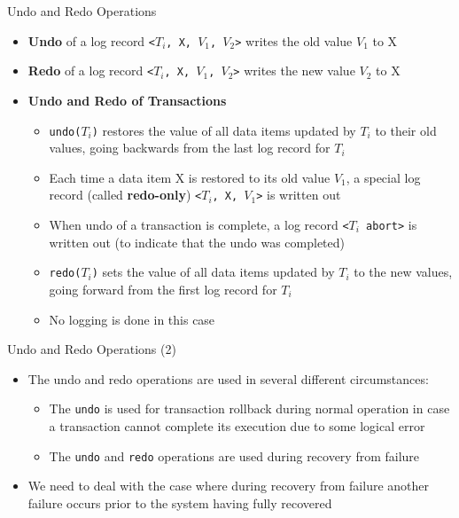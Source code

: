 \documentclass[aspectratio=169, xcolor=dvipsnames]{beamer}
\begin{document}
\begin{frame}{Undo and Redo Operations}
    \begin{itemize}[<+->]
        \item \textbf{Undo} of a log record \texttt{<$T_i$, X, $V_1$, $V_2$>} writes the old value $V_1$ to X
        \item \textbf{Redo} of a log record \texttt{<$T_i$, X, $V_1$, $V_2$>} writes the new value $V_2$ to X
        \item \textbf{Undo and Redo of Transactions}
        \begin{itemize}
            \item[$\triangleright$] \texttt{undo($T_i$)} restores the value of all data items updated by $T_i$ to their old values, going backwards from the last log record for $T_i$
            \item[$\triangleright$] Each time a data item X is restored to its old value $V_1$, a special log record (called \textbf{redo-only}) \texttt{<$T_i$, X, $V_1$>} is written out
            \item[$\triangleright$] When undo of a transaction is complete, a log record \texttt{<$T_i$ abort>} is written out (to indicate that the undo was completed)
            \item[$\triangleright$] \texttt{redo($T_i$)} sets the value of all data items updated by $T_i$ to the new values, going forward from the first log record for $T_i$
            \item[$\triangleright$] No logging is done in this case
        \end{itemize}
    \end{itemize}
\end{frame}

\begin{frame}{Undo and Redo Operations (2)}
    \begin{itemize}[<+->]
        \item The undo and redo operations are used in several different circumstances:
        \begin{itemize}
            \item[$\triangleright$] The \texttt{undo} is used for transaction rollback during normal operation in case a transaction cannot complete its execution due to some logical error
            \item[$\triangleright$] The \texttt{undo} and \texttt{redo} operations are used during recovery from failure
        \end{itemize}
        \item We need to deal with the case where during recovery from failure another failure occurs prior to the system having fully recovered
    \end{itemize}
\end{frame}
\end{document}
